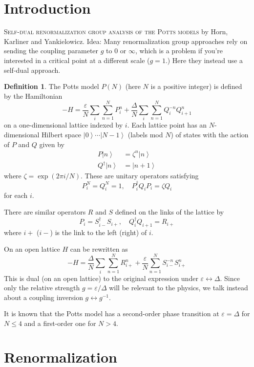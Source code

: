 \documentclass[11pt]{article}
\theoremstyle{definition}
\newtheorem{definition}{Definition}
\newcommand{\ket}[1]{\left | #1 \right \rangle}
\begin{document}
\section{Introduction}
\textsc {Self-dual renormalization group analysis of the Potts models} by Horn, Karliner and Yankielowicz.
Idea: Many renormalization group approaches rely on sending the coupling parameter $g$ to $0$ or $\infty$, which is a problem if you're interested in a critical point at a different scale ($g = 1$.)
Here they instead use a self-dual approach.

\begin{definition}
The Potts model $P(N)$ (here $N$ is a positive integer) is defined by the Hamiltonian
\[
-H = \frac{\varepsilon}{N} \sum_i \sum_{n=1}^N P_i^n + \frac{\Delta}{N} \sum_i \sum_{n=1}^N Q_i^{-n} Q_{i+1}^n
\]
on a one-dimensional lattice indexed by $i$.
Each lattice point has an $N$-dimensional Hilbert space $\ket{0} \cdots \ket{N-1}$ (labels mod $N$) of states with the action of $P$ and $Q$ given by
\begin{align*}
P \ket n &= \zeta^n \ket n\\
Q^\dagger \ket n &= \ket{n+1}
\end{align*}
where $\zeta = \exp(2 \pi i /N)$.
These are unitary operators satisfying
\[
P^N_i = Q^N_i = 1, \quad P_i^\dagger Q_i P_i = \zeta Q_i
\]
for each $i$.
\end{definition}
There are similar operators $R$ and $S$ defined on the links of the lattice by
\[
P_i = S_{i-}^\dagger S_{i+}, \quad Q_i^\dagger Q_{i+1} = R_{i+}
\]
where $i+$ ($i-$) is the link to the left (right) of $i$.

On an open lattice $H$ can be rewritten as
\[
-H = \frac{\Delta}{N} \sum_i \sum_{n=1}^N R_{i+}^n + \frac{\varepsilon}{N} \sum_{n=1}^N S_{i-}^{-n} S_{i+}^n 
\]
This is dual (on an open lattice) to the original expression under $\varepsilon \leftrightarrow \Delta$.
Since only the relative strength $g = \varepsilon / \Delta$ will be relevant to the physics, we talk instead about a coupling inversion $g \leftrightarrow g^{-1}$.

It is known that the Potts model has a second-order phase transition at $\varepsilon = \Delta$ for $N \le 4$ and a first-order one for $N > 4$.

\section{Renormalization}
\end{document}
